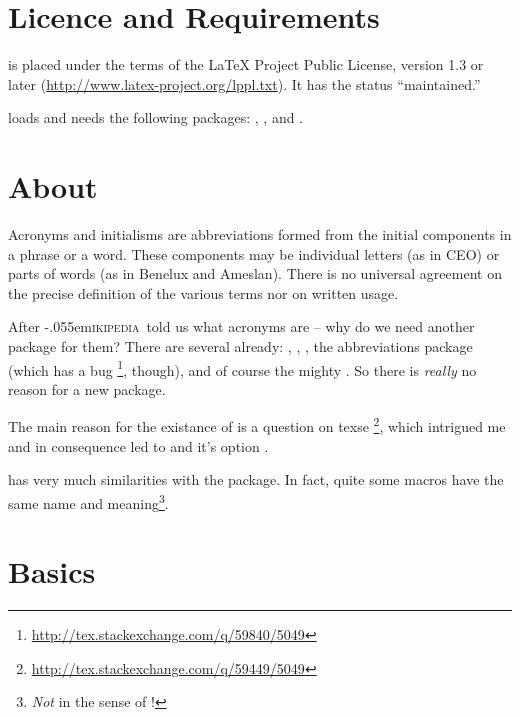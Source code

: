 \documentclass[DIV10,toc=index,toc=bib]{cnpkgdoc}
\newcommand*\wikipedia{\libertineGlyph{W.alt}\kern-.055em\textsc{ikipedia}}
\begin{document}
\newpage
\section{Licence and Requirements}
\acro is placed under the terms of the LaTeX Project Public License,
version 1.3 or later (\url{http://www.latex-project.org/lppl.txt}).
It has the status ``maintained.''

\acro loads and needs the following packages: ,
,  and .

\section{About}
\begin{zitat}
 Acronyms and initialisms are abbreviations formed from the initial components
 in a phrase or a word. These components may be individual letters (as in CEO)
 or parts of words (as in Benelux and Ameslan). There is no universal agreement
 on the precise definition of the various terms nor on written usage.
\end{zitat}
After \wikipedia\ told us what acronyms are -- why do we need another package
for them? There are several already: , ,
, the abbreviations package  (which has a bug%
\footnote{\url{http://tex.stackexchange.com/q/59840/5049}}, though), and of
course the mighty . So there is \emph{really} no reason for a
new package.

The main reason for the existance of \acro is a question on \acs{texse}%
\footnote{\url{http://tex.stackexchange.com/q/59449/5049}}, which intrigued me
and in consequence led to \acro and it's option .

\acro has very much similarities with the  package. In fact, quite
some macros have the same name and meaning\footnote{\emph{Not} in the sense of
\code{\textbackslash\textcolor{code}{meaning}}!}.

\section{Basics}
\end{document}
